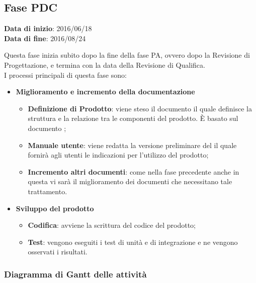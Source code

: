 	\subsection{Fase PDC}
	\begin{center}
		\textbf{Data di inizio}: 2016/06/18 \\
		\textbf{Data di fine}: 2016/08/24 \\
	\end{center}
	Questa fase inizia subito dopo la fine della fase PA, ovvero dopo la Revisione di Progettazione, e termina con la data della Revisione di Qualifica. \\
	I processi principali di questa fase sono: 
		\begin{itemize}
			\item \textbf{Miglioramento e incremento della documentazione}
			\att
			\begin{itemize}
				\item \textbf{Definizione di Prodotto}: viene steso il documento \DPdoc il quale definisce la struttura e la relazione tra le componenti del prodotto. È basato sul documento \STdoc;
				\item \textbf{Manuale utente}: viene redatta la versione preliminare del \MUdoc il quale fornirà agli utenti le indicazioni per l'utilizzo del prodotto;
				\item \textbf{Incremento altri documenti}: come nella fase precedente anche in questa vi sarà il miglioramento dei documenti che necessitano tale trattamento.
			\end{itemize}
			\item \textbf{Sviluppo del prodotto}
			\att
			\begin{itemize}
				\item \textbf{Codifica}: avviene la scrittura del codice del prodotto;
				\item \textbf{Test}: vengono eseguiti i test di unità e di integrazione e ne vengono osservati i risultati. 
			\end{itemize}
		\end{itemize}
		\subsubsection{Diagramma di Gantt delle attività}
		
